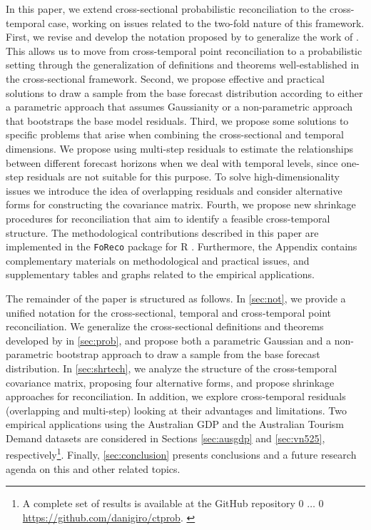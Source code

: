 \documentclass[12pt]{article}
\newcommand{\blind}{0}
\theoremstyle{definition}
\newcommand{\githuburl}{\begingroup%
\if1\blind
{
$\dots$
}\fi
\if0\blind
{
\url{https://github.com/danigiro/ctprob}.
}\fi
\endgroup}
\begin{document}
In this paper, we extend cross-sectional probabilistic reconciliation to the cross-temporal case, working on issues related to the two-fold nature of this framework. First, we revise and develop the notation proposed by \cite{difonzo2023} to generalize the work of \cite{panagiotelis2023}. This allows us to move from cross-temporal point reconciliation to a probabilistic setting through the generalization of definitions and theorems well-established in the cross-sectional framework. Second, we propose effective and practical solutions to draw a sample from the base forecast distribution according to either a parametric approach that assumes Gaussianity or a non-parametric approach that bootstraps the base model residuals. 
Third, we propose some solutions to specific problems that arise when combining the cross-sectional and temporal dimensions. We propose using multi-step residuals to estimate the relationships between different forecast horizons when we deal with temporal levels, since one-step residuals are not suitable for this purpose. To solve high-dimensionality issues we introduce the idea of overlapping residuals and consider alternative forms for constructing the covariance matrix. Fourth, we propose new shrinkage procedures for reconciliation that aim to identify a feasible cross-temporal structure. The methodological contributions described in this paper 
are implemented in the \texttt{FoReco} package \citep{foreco2023} for R \citep{rcoreteam2022}. Furthermore, the Appendix contains complementary materials on methodological and practical issues, and supplementary tables and graphs related to the empirical applications.

The remainder of the paper is structured as follows. In \autoref{sec:not}, we provide a unified notation for the cross-sectional, temporal and cross-temporal point reconciliation. We generalize the cross-sectional definitions and theorems developed by \cite{panagiotelis2023} in \autoref{sec:prob}, and propose both a parametric Gaussian and a non-parametric bootstrap approach to draw a sample from the base forecast distribution. In \autoref{sec:shrtech}, we analyze the structure of the cross-temporal covariance matrix, proposing four alternative forms, and propose shrinkage approaches for reconciliation. In addition, we explore cross-temporal residuals (overlapping and multi-step) looking at their advantages and limitations. %
Two empirical applications using the Australian GDP and the Australian Tourism Demand datasets are considered in Sections \ref{sec:ausgdp} and \ref{sec:vn525}, respectively\footnote{A complete set of results is available at the GitHub repository \githuburl}. Finally, \autoref{sec:conclusion} presents conclusions and a future research agenda on this and other related topics.
\end{document}
